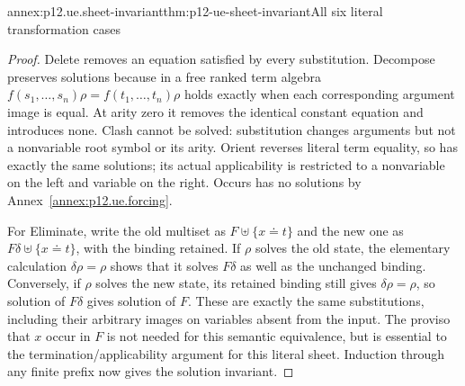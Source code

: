 \begin{annexitem}{annex:p12.ue.sheet-invariant}{thm:p12-ue-sheet-invariant}{All six literal transformation cases}
\begin{proof}
Delete removes an equation satisfied by every substitution.
Decompose preserves solutions because in a free ranked term algebra
\(f(s_1,\ldots,s_n)\rho=f(t_1,\ldots,t_n)\rho\) holds exactly
when each corresponding argument image is equal. At arity zero it
removes the identical constant equation and introduces none.
Clash cannot be solved: substitution changes arguments but not a
nonvariable root symbol or its arity. Orient reverses literal term
equality, so has exactly the same solutions; its actual applicability
is restricted to a nonvariable on the left and variable on the right.
Occurs has no solutions by Annex~\ref{annex:p12.ue.forcing}.

For Eliminate, write the old multiset as
\(F\uplus\{x\doteq t\}\) and the new one as
\(F\delta\uplus\{x\doteq t\}\), with the binding retained.
If \(\rho\) solves the old state, the elementary calculation
\(\delta\rho=\rho\) shows that it solves \(F\delta\) as well
as the unchanged binding. Conversely, if \(\rho\) solves the new
state, its retained binding still gives \(\delta\rho=\rho\),
so solution of \(F\delta\) gives solution of \(F\).
These are exactly the same substitutions, including their arbitrary
images on variables absent from the input. The proviso that \(x\)
occur in \(F\) is not needed for this semantic equivalence, but is
essential to the termination/applicability argument for this literal sheet.
Induction through any finite prefix now gives the solution invariant.
\end{proof}
\end{annexitem}

